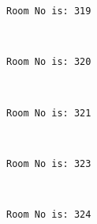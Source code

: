 \documentclass[11pt]{article}
\begin{document}
    \begin{Verbatim}[commandchars=\\\{\}]
Room No is: 319

    \end{Verbatim}

    \begin{center}
    \end{center}
    { \hspace*{\fill} \\}
    
    \begin{Verbatim}[commandchars=\\\{\}]
Room No is: 320

    \end{Verbatim}

    \begin{center}
    \end{center}
    { \hspace*{\fill} \\}
    
    \begin{Verbatim}[commandchars=\\\{\}]
Room No is: 321

    \end{Verbatim}

    \begin{center}
    \end{center}
    { \hspace*{\fill} \\}
    
    \begin{Verbatim}[commandchars=\\\{\}]
Room No is: 323

    \end{Verbatim}

    \begin{center}
    \end{center}
    { \hspace*{\fill} \\}
    
    \begin{Verbatim}[commandchars=\\\{\}]
Room No is: 324

    \end{Verbatim}
\end{document}
